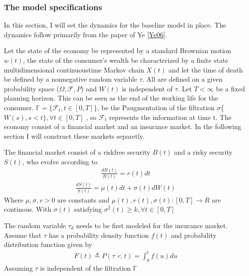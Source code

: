 \documentclass[letterpaper,10pt,english]{jupyterBook}
\begin{document}
\subsubsection{The model specifications}
\label{\detokenize{Financial_application:the-model-specifications}}
\sphinxAtStartPar
In this section, I will set the dynamics for the baseline model in place. The dynamics follow primarily from the paper of Ye {[}\hyperlink{cite.Financial_application:id24}{Ye06}{]}.

\sphinxAtStartPar
Let the state of the economy be represented by a standard Brownian motion \(w(t)\), the state of the consumer’s wealth be characterized by a finite state multi\sphinxhyphen{}dimensional continuous\sphinxhyphen{}time Markov chain \(X(t)\) and let the time of death be defined by a non\sphinxhyphen{}negative random variable \(\tau\). All are defined on a given probability space (\(\Omega, \mathcal{F}, P\)) and \(W(t)\) is independent of \(\tau\). Let \(T< \infty\) be a fixed planning horizon. This can be seen as the end of the working life for the consumer. \(\mathbb{F} = \{\mathcal{F}_t, t \in [0,T]\}\), be the P\sphinxhyphen{}augmentation of the filtration \(\sigma\)\{\(W(s), s<t \}, \forall t \in [0,T]\) , so \(\mathcal{F}_t\) represents the information at time t. The economy consist of a financial market and an insurance market. In the following section I will construct these markets separetly.

\sphinxAtStartPar
The financial market consist of a risk\sphinxhyphen{}free security \(B(t)\) and a risky security \(S(t)\), who evolve according to
\begin{equation*}
\begin{split} \frac{dB(t)}{B(t)}=r(t)dt \end{split}
\end{equation*}\begin{equation*}
\begin{split} \frac{dS(t)}{S(t)}=\mu(t)dt+\sigma(t)dW(t)\end{split}
\end{equation*}
\sphinxAtStartPar
Where \(\mu, \sigma, r > 0\) are constants and \(\mu(t), r(t), \sigma(t): [0,T] \to R\) are continous. With \(\sigma(t)\) satisfying \(\sigma^2(t) \ge k, \forall t \in [0,T]\)

\sphinxAtStartPar
The random variable \(\tau_d\) needs to be first modeled for the insurance  market. Assume that \(\tau\) has a probability density function \(f(t)\) and probability distribution function given by
\begin{equation*}
\begin{split} F(t) \triangleq P(\tau < t) = \int_0^t f(u) du \end{split}
\end{equation*}
\sphinxAtStartPar
Assuming \(\tau\) is independent of the filtration \(\mathbb{F}\)
\end{document}
